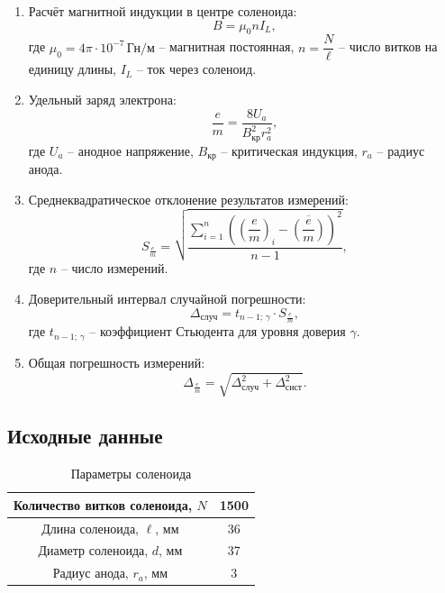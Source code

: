 \documentclass[14pt]{extarticle}
\begin{document}
\begin{enumerate}
    \item Расчёт магнитной индукции в центре соленоида:
    \begin{equation}
        B = \mu_0 n I_L,
    \end{equation}
    где $\mu_0 = 4\pi \cdot 10^{-7}\, \text{Гн/м}$ -- магнитная постоянная, $n = \dfrac{N}{\ell}$ -- число витков на единицу длины, $I_L$ -- ток через соленоид.
    
    \item Удельный заряд электрона:
    \begin{equation}
        \frac{e}{m} = \frac{8U_a}{B_{\text{кр}}^2 r_a^2},
    \end{equation}
    где $U_a$ -- анодное напряжение, $B_{\text{кр}}$ -- критическая индукция, $r_a$ -- радиус анода.
    
    \item Среднеквадратическое отклонение результатов измерений:
    \begin{equation}
        S_{\frac{e}{m}} = \sqrt{\dfrac{\sum\limits_{i=1}^{n} \left( \left( \dfrac{e}{m} \right)_i - \overline{\left( \dfrac{e}{m} \right)} \right)^2}{n-1}},
    \end{equation}
    где $n$ -- число измерений.
    
    \item Доверительный интервал случайной погрешности:
    \begin{equation}
        \Delta_{\text{случ}} = t_{n-1; \, \gamma} \cdot S_{\frac{e}{m}},
    \end{equation}
    где $t_{n-1; \, \gamma}$ -- коэффициент Стьюдента для уровня доверия $\gamma$.
    
    \item Общая погрешность измерений:
    \begin{equation}
        \Delta_{\frac{e}{m}} = \sqrt{\Delta_{\text{случ}}^2 + \Delta_{\text{сист}}^2}.
    \end{equation}
\end{enumerate}

\subsection{Исходные данные}

\begin{table}[H]
    \centering
    \caption{Параметры соленоида}
    \begin{tabular}{|c|c|}
        \hline
        Количество витков соленоида, $N$ & 1500 \\
        \hline
        Длина соленоида, $\ell$, мм & 36 \\
        \hline
        Диаметр соленоида, $d$, мм & 37 \\
        \hline
        Радиус анода, $r_a$, мм & 3 \\
        \hline
    \end{tabular}
\end{table}
\end{document}
